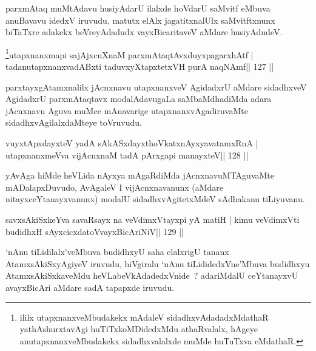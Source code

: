 \begin{artha}
parxmAtaq muMtAdavu husiyAdarU ilalxde hoVdarU saMvitf eMbuva anuBavavu idedxV iruvudu, matutx elAlx jagatitxnalUlx saMvitftxnunx biTaTxre adakekx beVreyAdadudx vayxBicaritaveV aMdare husiyAdudeV.
\end{artha}

\begin{shl}
\footnote{ililx utapxnanxveMbudakekx mAdaleV sidadhxvAdadadxMdathaR yathAshurxtavAgi huTiTxkoMDidedxMdu athaRvalalx, hAgeye anutapxnanxveMbudakekx sidadhxvalalxde muMde huTuTxva eMdathaR.}utapxnanxmapi sajAjxcnXnaM parxmAtaqtAvxduyxpagarxhAtf |
\footnotemark[\value{footnote}]tadanutapxnanxvadABxti taduvxyXtapxtetxVH purA naqNAmf\hfill || 127 ||
\end{shl}

\begin{artha}
parxtayxgAtamxnalilx jAcnxnavu utapxnanxveV AgidadxrU aMdare sidadhxveV AgidadxrU parxmAtaqtavx modalAdavugaLa saMbaMdhadiMda adara jAcnxnavu Aguva muMce mAnavarige utapxnanxvAgadiruvaMte sidadhxvAgilalxdaMteye toVruvudu.
\end{artha}


\begin{shl}
vuyxtApxdayxteV yadA sAkASxdayxthoVkatxnAyxyavatamxRnA |
utapxnanxmeVva vijAcnxnaM tadA pArxgapi manayxteV\hfill || 128 ||
\end{shl}

\begin{artha}
yAvAga hiMde heVLida nAyxya mAgaRdiMda jAcnxnavuMTAguvaMte mADalapxDuvudo, AvAgaleV I vijAcnxnavanunx (aMdare nitayxceYtanayxvanunx) modalU sidadhxvAgitetxMdeV sAdhakanu tiLiyuvanu.
\end{artha}

\begin{shl}
savxsAkiSxkeYva savaRsayx na veVdimxVtayxpi yA matiH |
kimu veVdimxVti budidhxH sAyxcicxdatoV\s vayxBicAriNiV\hfill || 129 ||
\end{shl}

\begin{artha}
`nAnu tiLidilalx'veMbuva budidhxyU saha elalxrigU tananx AtamxsAkiSxyAgiyeV iruvudu, hiVgiralu `nAnu tiLididedxVne'Mbuva budidhxyu AtamxsAkiSxkaveMdu heVLabeVkAdadedxVnide~? adariMdalU ceYtanayxvU avayxBicAri aMdare sadA tapapxde iruvudu.
\end{artha}


